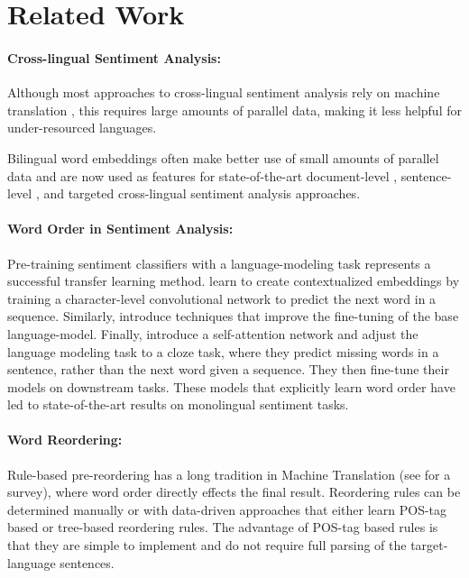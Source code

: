 \documentclass[11pt,a4paper]{article}
\begin{document}
\section{Related Work}

\paragraph{Cross-lingual Sentiment Analysis: }

Although most approaches to cross-lingual sentiment analysis rely on machine translation \cite{Banea2008,Balahur2014d,Klinger2015}, this requires large amounts of parallel data,
making it less helpful for under-resourced languages.


Bilingual word embeddings \cite{Mikolov2013translation,Artetxe2017,Lample2017} often make 
better use of small amounts of parallel data and are now used as features for state-of-the-art document-level \cite{Chen2016}, sentence-level \cite{Barnes2018b}, and targeted \cite{Hangya2018} cross-lingual sentiment analysis approaches.


\paragraph{Word Order in Sentiment Analysis: }

Pre-training sentiment classifiers with a language-modeling task represents a successful transfer learning method.  learn
to create contextualized embeddings by training a character-level convolutional
network to predict the next word in a sequence. Similarly,  introduce techniques that improve the fine-tuning of the base language-model. Finally, 
 introduce a self-attention network and adjust the language
modeling task to a cloze task, where they predict missing words in a sentence, rather than the next word given a sequence. They then fine-tune their models on downstream tasks. These models that explicitly learn word order have led to state-of-the-art results on monolingual sentiment tasks.

\paragraph{Word Reordering: }

Rule-based pre-reordering has a long tradition in Machine Translation (see  for a survey), where word order directly effects the final result. Reordering rules can be determined manually \cite{Collins2005,Gojun2012} or with data-driven approaches that either learn POS-tag based \cite{Crego2006,Crego2006b} or tree-based \cite{Neubig2012,Nakagawa2015} reordering rules. The advantage of POS-tag based rules is that they are simple to implement and do not require full parsing of the target-language sentences.
\end{document}
